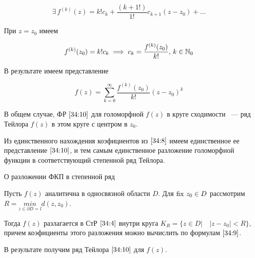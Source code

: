 \documentclass[../../main.tex]{subfiles}
\begin{document}
\[ \exists\, f^{(k)}(z) = k!c_k + \frac{(k + 1!)}{1!}c_{k + 1}(z - z_0) + \ldots \]

При $ z = z_0 $ имеем

\begin{equation}\label{34:9}
	f^{(k)}(z_0) = k!c_k \implies c_k = \frac{f^{(k)}(z_0)}{k!},\, k \in \mathbb{N}_0
\end{equation}

В результате имеем представление

\begin{equation}\label{34:10}
	f(z) = \sum\limits_{k = 0}^{\infty} \frac{f^{(k)}(z_0)}{k!}(z - z_0)^k
\end{equation}

В общем случае, ФР $ \eqref{34:10} $ для голоморфной $ f(z) $ в круге сходимости ~--- ряд Тейлора $ f(z) $ в этом круге с центром в $ z_0 $.

Из единственного нахождения коэфициентов из $ \eqref{34:8} $ имеем единственное ее представление $ \eqref{34:10} $, и тем самым единственное разложение голоморфной функции в соответствующий степенной ряд Тейлора.

\begin{thm}{О разложении ФКП в степенной ряд}
	\;
	
	Пусть $ f(z) $ аналитична в односвязной области $ D $. Для $ \operatorname{fix}\, z_0 \in D $ рассмотрим $ R = \underset{z \in \partial D = l}{min}d(z, z_0) $.
	
	Тогда $ f(z) $ разлагается в СтР $ \eqref{34:4} $ внутри круга $ K_R = \{z \in D | \quad |z - z_0| < R \} $, причем коэфициенты этого разложения можно вычислить по формулам $ \eqref{34:9} $.
	
	В результате получим ряд Тейлора $ \eqref{34:10} $ для $f(z)$.
\end{thm}
\end{document}
